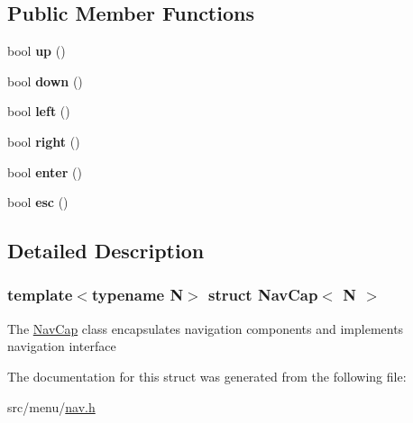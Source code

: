 \subsection*{Public Member Functions}
\begin{DoxyCompactItemize}
\item 
\mbox{\label{structNavCap_a30b1eeca347d6b1360adab36e7d8fdd2}} 
bool {\bfseries up} ()
\item 
\mbox{\label{structNavCap_a177f97a3e0fd8f5426b57176a14c6beb}} 
bool {\bfseries down} ()
\item 
\mbox{\label{structNavCap_af6986a6491630b8486be8bbd96edd057}} 
bool {\bfseries left} ()
\item 
\mbox{\label{structNavCap_a4120f4c9415af7213042996a3e69f64d}} 
bool {\bfseries right} ()
\item 
\mbox{\label{structNavCap_a8fb8977758161d549f9505fd628b841f}} 
bool {\bfseries enter} ()
\item 
\mbox{\label{structNavCap_a31ea5a40bca04eb2abb4a642bfa9c282}} 
bool {\bfseries esc} ()
\end{DoxyCompactItemize}


\subsection{Detailed Description}
\subsubsection*{template$<$typename N$>$\newline
struct Nav\+Cap$<$ N $>$}

The \hyperlink{structNavCap}{Nav\+Cap} class encapsulates navigation components and implements navigation interface 

The documentation for this struct was generated from the following file\+:\begin{DoxyCompactItemize}
\item 
src/menu/\hyperlink{nav_8h}{nav.\+h}\end{DoxyCompactItemize}
